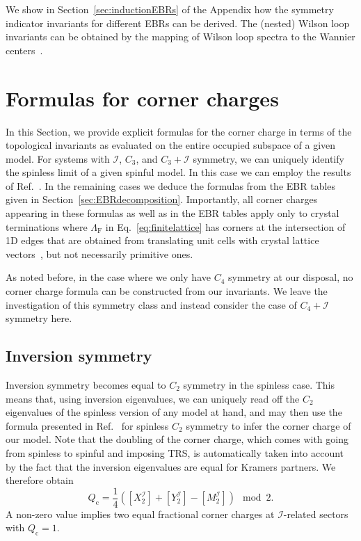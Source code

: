 We show in Section~\ref{sec:inductionEBRs} of the Appendix how the symmetry indicator invariants for different EBRs can be derived. The (nested) Wilson loop invariants can be obtained by the mapping of Wilson loop spectra to the Wannier centers~\cite{MarziariWF2012}.

\section{Formulas for corner charges}
\label{sec:mappingformulae}
In this Section, we provide explicit formulas for the corner charge in terms of the topological invariants as evaluated on the entire occupied subspace of a given model. For systems with $\mathcal{I}$, $C_3$, and $C_3 + \mathcal{I}$ symmetry, we can uniquely identify the spinless limit of a given spinful model. In this case we can employ the results of Ref.~\cite{benalcazar2018quantization}. In the remaining cases we deduce the formulas from the EBR tables given in Section~\ref{sec:EBRdecomposition}. Importantly, all corner charges appearing in these formulas as well as in the EBR tables apply only to crystal terminations where $\Lambda_{\mathrm{F}}$ in Eq.~\eqref{eq:finitelattice} has corners at the intersection of 1D edges that are obtained from translating unit cells with crystal lattice vectors~\cite{benalcazar2018quantization}, but not necessarily primitive ones.

As noted before, in the case where we only have $C_4$ symmetry at our disposal, no corner charge formula can be constructed from our invariants. We leave the investigation of this symmetry class and instead consider the case of $C_4 + \mathcal{I}$ symmetry here.

\subsection{Inversion symmetry}
Inversion symmetry becomes equal to $C_2$ symmetry in the spinless case. This means that, using inversion eigenvalues, we can uniquely read off the $C_2$ eigenvalues of the spinless version of any model at hand, and may then use the formula presented in Ref.~\cite{benalcazar2018quantization} for spinless $C_2$ symmetry to infer the corner charge of our model. Note that the doubling of the corner charge, which comes with going from spinless to spinful and imposing TRS, is automatically taken into account by the fact that the inversion eigenvalues are equal for Kramers partners. We therefore obtain
\begin{equation}
Q_\mathrm{c} = \frac{1}{4}\left( [X^\mathcal{I}_2] + [Y^\mathcal{I}_2] - [M^\mathcal{I}_2]\right) \mod 2.
\label{eq:cornerchargewithjustinversion}
\end{equation}
A non-zero value implies two equal fractional corner charges at $\mathcal{I}$-related sectors with $Q_\mathrm{c} = 1$.

